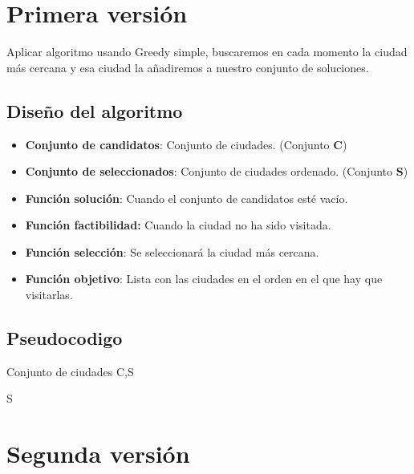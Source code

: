 	
	
	\section{Primera versión} 


		Aplicar algoritmo usando Greedy simple, buscaremos en cada momento la ciudad más cercana y esa ciudad
		la añadiremos a nuestro conjunto de soluciones. 
		
	
	
	\subsection{Diseño del algoritmo} 
	
			\begin{itemize}
			\item \textbf{Conjunto de candidatos}: Conjunto de ciudades. (Conjunto \textbf{C})
			\item \textbf{Conjunto de seleccionados}: Conjunto de ciudades ordenado. (Conjunto \textbf{S})
			\item \textbf{Función solución}: Cuando el conjunto de candidatos esté vacío.
			\item \textbf{Función factibilidad:} Cuando la ciudad no ha sido visitada.
			\item \textbf{Función selección}: Se seleccionará la ciudad más cercana.
			\item \textbf{Función objetivo}: Lista con las ciudades en el orden en el que hay que visitarlas.		
		\end{itemize}		
		
	\subsection{Pseudocodigo}
	
		
		\begin{algorithmic}
			\Require Conjunto de ciudades C,S
			\EndIf
			\EndFor  
			
			\Return S	
		\end{algorithmic}	
	
	
	
	\section{Segunda versión} 
	

